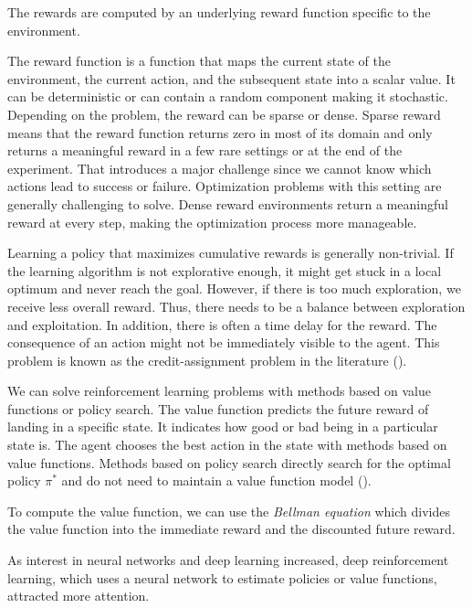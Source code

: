 The rewards are computed by an underlying reward function specific to the environment.

The reward function is a function that maps the current state of the environment, the current action, and the subsequent state into a scalar value. It can be deterministic or can contain a random component making it stochastic. Depending on the problem, the reward can be sparse or dense. Sparse reward means that the reward function returns zero in most of its domain and only returns a meaningful reward in a few rare settings or at the end of the experiment. That introduces a major challenge since we cannot know which actions lead to success or failure. Optimization problems with this setting are generally challenging to solve. Dense reward environments return a meaningful reward at every step, making the optimization process more manageable.

Learning a policy that maximizes cumulative rewards is generally non-trivial. If the learning algorithm is not explorative enough, it might get stuck in a local optimum and never reach the goal. However, if there is too much exploration, we receive less overall reward. Thus, there needs to be a balance between exploration and exploitation. In addition, there is often a time delay for the reward. The consequence of an action might not be immediately visible to the agent. This problem is known as the credit-assignment problem in the literature (\cite{sutton2018reinforcement}).

We can solve reinforcement learning problems with methods based on value functions or policy search. The value function predicts the future reward of landing in a specific state. It indicates how good or bad being in a particular state is. The agent chooses the best action in the state with methods based on value functions. Methods based on policy search directly search for the optimal policy $\pi^*$ and do not need to maintain a value function model (\cite{8103164}).

To compute the value function, we can use the \textit{Bellman equation} which divides the value function into the immediate reward and the discounted future reward.

As interest in neural networks and deep learning increased, deep reinforcement learning, which uses a neural network to estimate policies or value functions, attracted more attention.

